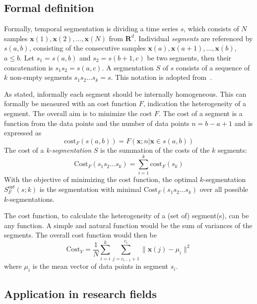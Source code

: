 \subsection{Formal definition}
Formally, temporal segmentation is dividing a time series $s$, which consists of $N$ samples $\mathbf{x}(1),\mathbf{x}(2),\dots,\mathbf{x}(N)$ from $\mathbf{R}^d$.
Individual \emph{segments} are referenced by $s(a,b)$, consisting of the consecutive samples $\mathbf{x}(a),\mathbf{x}(a+1),\dots,\mathbf{x}(b)$, $a \le b$.
Let $s_1 = s(a,b)$ and $s_2 = s(b+1,c)$ be two segments, then their concatenation is $s_1s_2 = s(a,c)$.
A segmentation $S$ of $s$ consists of a sequence of $k$ non-empty segments $s_1s_2 \dots s_k = s$.
This notation is adopted from~\cite{himberg2001time}.

As stated, informally each segment should be internally homogeneous.
This can formally be measured with an cost function $F$, indication the heterogeneity of a segment.
The overall aim is to minimize the cost $F$. The cost of a segment is a function from the data points and the number of data points
$n = b - a + 1$ and is expressed as
\begin{equation}
	\label{eq:segment_cost}
	\mathrm{cost}_F (s(a,b)) = F(\mathbf{x};n|\mathbf{x} \in s(a,b))
\end{equation}
The cost of a \emph{k-segmentation} $S$ is the summation of the costs of the $k$ segments:
\begin{equation}
	\label{eq:segmentation_cost}
	\mathrm{Cost}_F (s_1 s_2 \dots s_k) = \sum_{i=1}^{k} \mathrm{cost}_F (s_k)
\end{equation}
With the objective of minimizing the cost function, the optimal $k$-segmentation $S_F^\mathit{opt}(s;k)$ is the segmentation with minimal $\mathrm{Cost}_F(s_1 s_2 \dots s_k)$ over all possible $k$-segmentations.

The cost function, to calculate the heterogeneity of a (set of) segment(s), can be any function.
A simple and natural function would be the sum of variances of the segments.
The overall cost function would then be
\begin{equation}
	\label{eq:cost_variances}
	\mathrm{Cost}_V = \frac{1}{N} \sum_{i=i}^{k} \sum_{j=c_{i-1}+1}^{c_i} \|
	\mathbf{x}(j) - \mu_i \|^2
\end{equation}
where $\mu_i$ is the mean vector of data points in segment $s_i$.

\subsection{Application in research fields}

